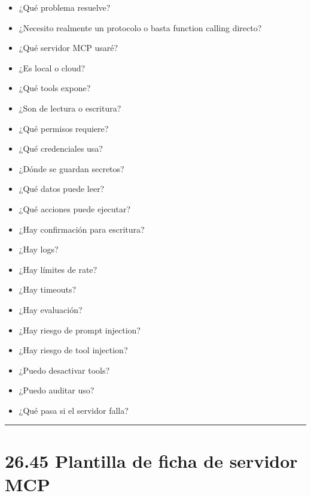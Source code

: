 \begin{itemize}
\tightlist
\item
  ¿Qué problema resuelve?
\item
  ¿Necesito realmente un protocolo o basta function calling directo?
\item
  ¿Qué servidor MCP usaré?
\item
  ¿Es local o cloud?
\item
  ¿Qué tools expone?
\item
  ¿Son de lectura o escritura?
\item
  ¿Qué permisos requiere?
\item
  ¿Qué credenciales usa?
\item
  ¿Dónde se guardan secretos?
\item
  ¿Qué datos puede leer?
\item
  ¿Qué acciones puede ejecutar?
\item
  ¿Hay confirmación para escritura?
\item
  ¿Hay logs?
\item
  ¿Hay límites de rate?
\item
  ¿Hay timeouts?
\item
  ¿Hay evaluación?
\item
  ¿Hay riesgo de prompt injection?
\item
  ¿Hay riesgo de tool injection?
\item
  ¿Puedo desactivar tools?
\item
  ¿Puedo auditar uso?
\item
  ¿Qué pasa si el servidor falla?
\end{itemize}

\begin{center}\rule{0.5\linewidth}{0.5pt}\end{center}

\section{26.45 Plantilla de ficha de servidor
MCP}\label{plantilla-de-ficha-de-servidor-mcp}

